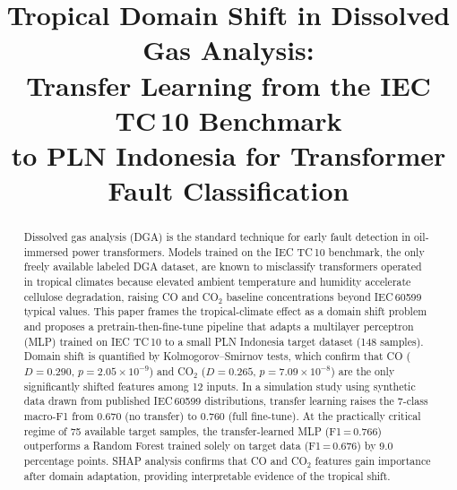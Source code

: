 \documentclass[conference]{IEEEtran}
\begin{document}
\title{Tropical Domain Shift in Dissolved Gas Analysis:\\
Transfer Learning from the IEC TC\,10 Benchmark\\
to PLN Indonesia for Transformer Fault Classification}

\author{
}

\maketitle

\begin{abstract}
Dissolved gas analysis (DGA) is the standard technique for early
fault detection in oil-immersed power transformers.
Models trained on the IEC TC\,10 benchmark, the only freely available
labeled DGA dataset, are known to misclassify transformers operated in
tropical climates because elevated ambient temperature and humidity
accelerate cellulose degradation, raising CO and CO$_2$ baseline
concentrations beyond IEC\,60599 typical values.
This paper frames the tropical-climate effect as a domain shift
problem and proposes a pretrain-then-fine-tune pipeline that
adapts a multilayer perceptron (MLP) trained on IEC TC\,10
to a small PLN Indonesia target dataset (148 samples).
Domain shift is quantified by Kolmogorov--Smirnov tests,
which confirm that CO ($D=0.290$, $p=2.05\times10^{-9}$) and
CO$_2$ ($D=0.265$, $p=7.09\times10^{-8}$) are the only significantly
shifted features among 12 inputs.
In a simulation study using synthetic data drawn from published
IEC\,60599 distributions, transfer learning raises the 7-class
macro-F1 from 0.670 (no transfer) to 0.760 (full fine-tune).
At the practically critical regime of 75 available target samples,
the transfer-learned MLP (F1\,=\,0.766) outperforms a Random Forest
trained solely on target data (F1\,=\,0.676) by 9.0 percentage points.
SHAP analysis confirms that CO and CO$_2$ features gain importance
after domain adaptation, providing interpretable evidence of
the tropical shift.
\end{abstract}
\end{document}
